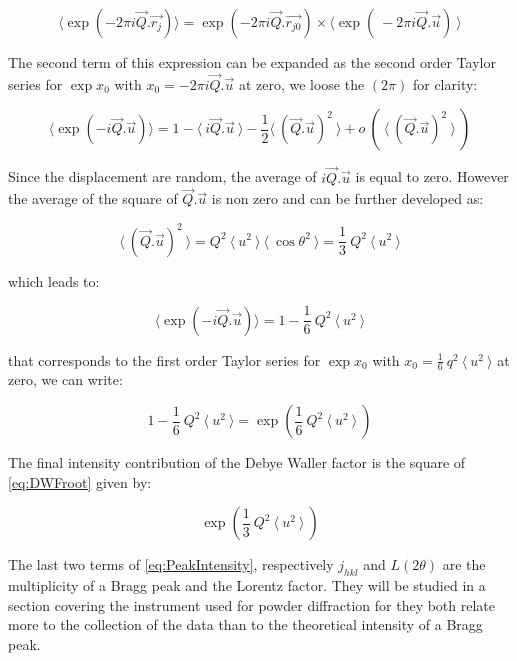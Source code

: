\begin{equation}
    \langle \exp{(-2\pi i \vec{Q}.\vec{r_j})} \rangle= \exp{(-2\pi i \vec{Q}.\vec{r_{j0}})} \times \langle \exp{(\ -2\pi i \vec{Q}.\vec{u})\ }\rangle
\end{equation}{}

The second term of this expression can be expanded as the second order Taylor series for $\exp{x_0}$ with $x_0 = -2\pi i \vec{Q}.\vec{u}$ at zero, we loose the $(2\pi)$ for clarity:

\begin{equation}
    \langle \exp{(- i \vec{Q}.\vec{u})}\rangle = 1 - \langle \ i \vec{Q}.\vec{u} \ \rangle - \frac{1}{2} \langle \ (\vec{Q}.\vec{u})^2 \ \rangle + o \ ( \ \langle \ (\vec{Q}.\vec{u})^2 \ \rangle \ )
\end{equation}

Since the displacement are random, the average of $i \vec{Q}.\vec{u}$ is equal to zero. However the average of the square of $\vec{Q}.\vec{u}$ is non zero and can be further developed as:

\begin{equation}
    \langle \ (\vec{Q}.\vec{u})^2 \ \rangle = Q^2 \ \langle \ u^2 \ \rangle \  \langle \ \cos{\theta}^2 \ \rangle = \frac{1}{3} \  Q^2 \ \langle \ u^2 \ \rangle
\end{equation}{}

which leads to:

\begin{equation}
    \langle \exp{(- i \vec{Q}.\vec{u})}\rangle = 1 - \frac{1}{6} \ Q^2 \ \langle \ u^2 \ \rangle
\end{equation}

that corresponds to the first order Taylor series for $\exp{x_0}$ with $x_0 = \frac{1}{6} \ q^2 \ \langle \ u^2 \ \rangle $ at zero, we can write:

\begin{equation}
    \label{eq:DWFroot}
    1 - \frac{1}{6} \ Q^2 \ \langle \ u^2 \ \rangle = \exp{( \frac{1}{6} \ Q^2 \ \langle \ u^2 \ \rangle \ )}
\end{equation}

The final intensity contribution of the Debye Waller factor is the square of \eqref{eq:DWFroot} given by:

\begin{equation}
    \label{eq:DWF}
    \exp{( \frac{1}{3} \ Q^2 \ \langle \ u^2 \ \rangle \ )}
\end{equation}

The last two terms of \eqref{eq:PeakIntensity}, respectively $j_{hkl}$ and $L(2\theta)$ are the multiplicity of a Bragg peak and the Lorentz factor. They will be studied in a section covering the instrument used for powder diffraction for they both relate more to the collection of the data than to the theoretical intensity of a Bragg peak.


